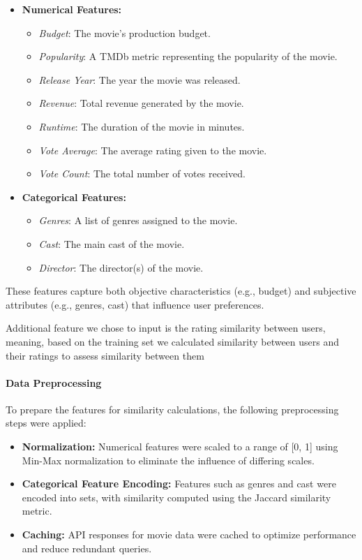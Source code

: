 \documentclass[a3paper,12pt]{article}
\begin{document}
\begin{itemize}
    \item \textbf{Numerical Features:}
    \begin{itemize}
        \item \textit{Budget}: The movie's production budget.
        \item \textit{Popularity}: A TMDb metric representing the popularity of the movie.
        \item \textit{Release Year}: The year the movie was released.
        \item \textit{Revenue}: Total revenue generated by the movie.
        \item \textit{Runtime}: The duration of the movie in minutes.
        \item \textit{Vote Average}: The average rating given to the movie.
        \item \textit{Vote Count}: The total number of votes received.
    \end{itemize}
    \item \textbf{Categorical Features:}
    \begin{itemize}
        \item \textit{Genres}: A list of genres assigned to the movie.
        \item \textit{Cast}: The main cast of the movie.
        \item \textit{Director}: The director(s) of the movie.
    \end{itemize}
\end{itemize}

These features capture both objective characteristics (e.g., budget) and subjective attributes (e.g., genres, cast)
that influence user preferences.

Additional feature we chose to input is the rating similarity between users, meaning, based on the training set
we calculated similarity between users and their ratings to assess similarity between them

\paragraph{Data Preprocessing}
To prepare the features for similarity calculations, the following
preprocessing steps were applied:

\begin{itemize}
    \item \textbf{Normalization:} Numerical features were scaled to a range of [0, 1] using Min-Max normalization to eliminate the influence of differing scales.
    \item \textbf{Categorical Feature Encoding:} Features such as genres and cast were encoded into sets, with similarity computed using the Jaccard similarity metric.
    \item \textbf{Caching:} API responses for movie data were cached to optimize performance and reduce redundant queries.
\end{itemize}
\end{document}
